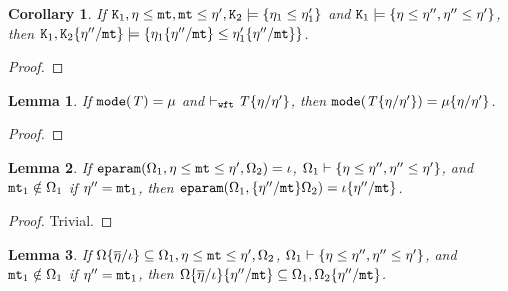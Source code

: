 \documentclass[onecolumn,nocopyrightspace]{sigplanconf}
\newtheorem{lemma}{Lemma}
\newtheorem{corollary}{Corollary}
\theoremstyle{lessintrusive}
\theoremstyle{plain}
\theoremstyle{custom}
\theoremstyle{subcase-custom}
\def\econsexp#1#2#3{#1\msub#2\msub#3}
\begin{document}
\begin{corollary}
\label{pf:modesubstitution-preserves-constraints}
If $\mathtt{K}_{1},\eta\leq\mathtt{mt},\mathtt{mt}\leq\eta',\mathtt{K}_{2}\models\{\eta_{1}\leq\eta_{1}'\}$ and $\mathtt{K}_{1}\models\{\eta\leq\eta'',\eta''\leq\eta'\}$, then $\mathtt{K}_{1},\mathtt{K}_{2}\{\eta''/\mathtt{mt}\}\models\{\eta_{1}\{\eta''/\mathtt{mt}\}\leq\eta_{1}'\{\eta''/\mathtt{mt}\}\}$.
\end{corollary}

\begin{proof}
\end{proof}

\begin{lemma}
\label{pf:modesubstitution-preserves-mode}
If $\mathtt{mode}(\mathit{T}) = \mu$ and $\vdash_{\tt wft} \mathit{T}\{\eta/\eta'\}$, then $\mathtt{mode}(\mathit{T}\{\eta/\eta'\}) = \mu\{\eta/\eta'\}$.
\end{lemma}

\begin{proof}
\end{proof}


\begin{lemma}
\label{pf:modesubstitution-preserves-eparam}
If $\Feparam(\espec_{1},\econsexp{\basemode}{\mtvar}{\basemode'},\espec_{2}) = \iota$, $\Omega_{1} \vdash \{\eta\leq\eta'',\eta''\leq\eta'\}$, and $\mathtt{mt}_{1} \notin \Omega_{1}$ if $\eta'' = \mathtt{mt}_{1}$, then $\mathtt{eparam}(\Omega_{1},\{\eta''/\mathtt{mt}\}\Omega_{2}) = \iota\{\eta''/\mathtt{mt}\}$.
\end{lemma}

\begin{proof}
Trivial.
\end{proof}

\begin{lemma}
\label{pf:modesubstitution-preserves-subset}
If $\espec\subst{\listi}{\overline{\basemode}}\subseteq\espec_{1},\econsexp{\basemode}{\mtvar}{\basemode'},\espec_{2}$, $\Omega_{1} \vdash \{\eta\leq\eta'',\eta''\leq\eta'\}$, and $\mathtt{mt}_{1} \notin \Omega_{1}$ if $\eta'' = \mathtt{mt}_{1}$, then $\Omega\{\overline{\eta}/\iota\}\{\eta''/\mathtt{mt}\}\subseteq\Omega_{1},\Omega_{2}\{\eta''/\mathtt{mt}\}$.
\end{lemma}
\end{document}
